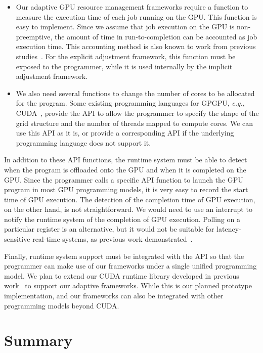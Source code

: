 \documentclass{acm_proc_article-sp}
\begin{document}
\begin{itemize}
 \item Our adaptive GPU resource management frameworks require a
       function to measure the execution time of each job running on the
       GPU.
       This function is easy to implement.
       Since we assume that job execution on the GPU is non-preemptive,
       the amount of time in run-to-completion can be accounted as job
       execution time.
       This accounting method is also known to work from previous
       studies~\cite{Kato_ATC11, Rossbach_SOSP11}.
       For the explicit adjustment framework, this function must be
       exposed to the programmer, while it is used internally
       by the implicit adjustment framework.
 \item We also need several functions to change the number of cores to
       be allocated for the program.
       Some existing programming languages for GPGPU, \textit{e.g.},
       CUDA~\cite{CUDA}, provide the API to allow the programmer to
       specify the shape of the grid structure and the number of threads
       mapped to compute cores.
       We can use this API as it is, or provide a corresponding API if
       the underlying programming language does not support it.
\end{itemize}

In addition to these API functions, the runtime system must be able to
detect when the program is offloaded onto the GPU and when it is
completed on the GPU.
Since the programmer calls a specific API function to launch the GPU
program in most GPU programming models, it is very easy to record the
start time of GPU execution.
The detection of the completion time of GPU execution, on the other hand, is
not straightforward.
We would need to use an interrupt to notify the runtime system of
the completion of GPU execution.
Polling on a particular register is an alternative, but it
would not be suitable for latency-sensitive real-time systems, as
previous work demonstrated~\cite{Kato_ATC11}.

Finally, runtime system support must be integrated with the API so that
the programmer can make use of our frameworks under a single unified
programming model.
We plan to extend our CUDA runtime library developed in previous
work~\cite{Kato_OSPERT11} to support our adaptive frameworks.
While this is our planned prototype implementation, and our frameworks can also be
integrated with other programming models beyond CUDA.

\section{Summary}
\label{sec:summary}
\end{document}
